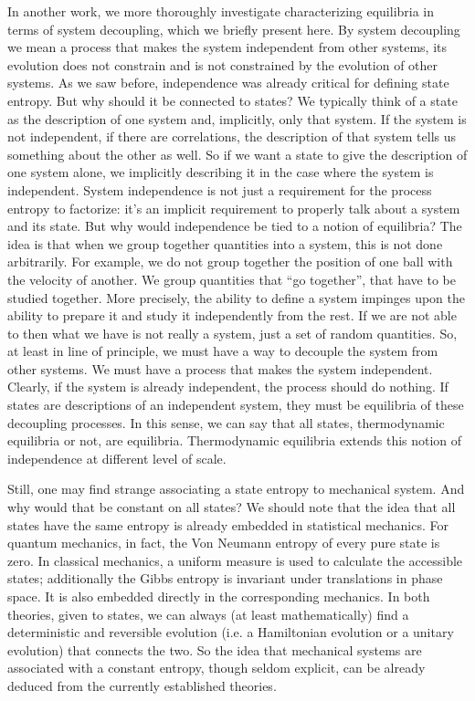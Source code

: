 \documentclass[letterpaper,twocolumn]{article}
\begin{document}
In another work, we more thoroughly investigate characterizing equilibria in terms of system decoupling, which we briefly present here. By system decoupling we mean a process that makes the system independent from other systems, its evolution does not constrain and is not constrained by the evolution of other systems. As we saw before, independence was already critical for defining state entropy. But why should it be connected to states? We typically think of a state as the description of one system and, implicitly, only that system. If the system is not independent, if there are correlations, the description of that system tells us something about the other as well. So if we want a state to give the description of one system alone, we implicitly describing it in the case where the system is independent. System independence is not just a requirement for the process entropy to factorize: it's an implicit requirement to properly talk about a system and its state. But why would independence be tied to a notion of equilibria? The idea is that when we group together quantities into a system, this is not done arbitrarily. For example, we do not group together the position of one ball with the velocity of another. We group quantities that ``go together'', that have to be studied together. More precisely, the ability to define a system impinges upon the ability to prepare it and study it independently from the rest. If we are not able to then what we have is not really a system, just a set of random quantities. So, at least in line of principle, we must have a way to decouple the system from other systems. We must have a process that makes the system independent. Clearly, if the system is already independent, the process should do nothing. If states are descriptions of an independent system, they must be equilibria of these decoupling processes. In this sense, we can say that all states, thermodynamic equilibria or not, are equilibria. Thermodynamic equilibria extends this notion of independence at different level of scale.

Still, one may find strange associating a state entropy to mechanical system. And why would that be constant on all states? We should note that the idea that all states have the same entropy is already embedded in statistical mechanics. For quantum mechanics, in fact, the Von Neumann entropy of every pure state is zero. In classical mechanics, a uniform measure is used to calculate the accessible states; additionally the Gibbs entropy is invariant under translations in phase space. It is also embedded directly in the corresponding mechanics. In both theories, given to states, we can always (at least mathematically) find a deterministic and reversible evolution (i.e. a Hamiltonian evolution or a unitary evolution) that connects the two. So the idea that mechanical systems are associated with a constant entropy, though seldom explicit, can be already deduced from the currently established theories.
\end{document}

